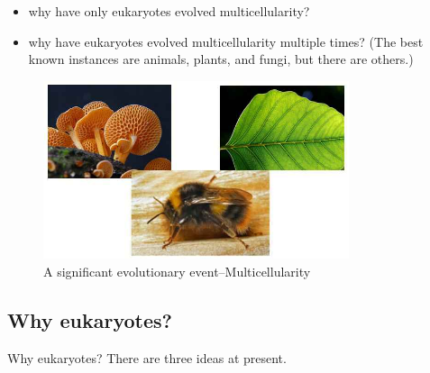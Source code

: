 \documentclass[]{article}
\begin{document}
\begin{itemize}
	\item why have only eukaryotes evolved multicellularity?
	\item why have eukaryotes evolved multicellularity multiple times? (The best known instances are animals, plants, and fungi, but there are others.)
\end{itemize}

\begin{figure}[H]
	\caption{A significant evolutionary event--Multicellularity}\label{fig:multicellularity}
	\includegraphics[width=0.8\textwidth]{multicellularity}
\end{figure}

\subsection{Why eukaryotes?}
Why eukaryotes? There are three ideas at present.
\end{document}
